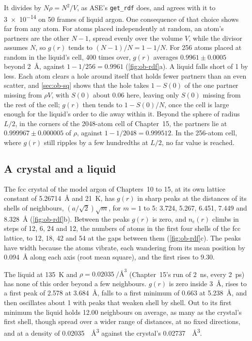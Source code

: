 \noindent It divides by $N\rho = N^2/V$, as ASE's \texttt{get\_rdf}
does\cite{Larsen2017}, and agrees with it to \num{3e-14} on 50 frames of
liquid argon. One consequence of that choice shows far from any atom.
For atoms placed independently at random, an atom's partners are the
other $N - 1$, spread evenly over the volume $V$, while the divisor
assumes $N$, so $g(r)$ tends to $(N - 1)/N = 1 - 1/N$. For 256 atoms
placed at random in the liquid's cell, 400 times over, $g(r)$ averages
$0.9961 \pm 0.0005$ beyond \SI{2}{\angstrom}, against $1 - 1/256 = 0.9961$
(\cref{fig:ob-rdf}a). A liquid falls short of 1 by less. Each atom clears
a hole around itself that holds fewer partners than an even scatter, and
\cref{sec:ob-sq} shows that the hole takes $1 - S(0)$ of the one partner
missing from $\rho V$, with $S(0)$ about 0.06 here, leaving only $S(0)$
missing from the rest of the cell; $g(r)$ then tends to $1 - S(0)/N$, once
the cell is large enough for the liquid's order to die away within it.
Beyond the sphere of radius $L/2$, in the corners of the 2048-atom cell
of Chapter~15, the partners lie at $0.999967 \pm 0.000005$ of $\rho$,
against $1 - 1/2048 = 0.999512$. In the 256-atom cell, where $g(r)$ still
ripples by a few hundredths at $L/2$, no far value is reached.

\subsection*{A crystal and a liquid}

The fcc crystal of the model argon of Chapters~10 to 15, at its own
lattice constant of \SI{5.26714}{\angstrom} and \SI{21}{\kelvin}, has
$g(r)$ in sharp peaks at the distances of its shells of neighbours,
$(a/\sqrt2)\sqrt m$, for $m = 1$ to 5: \num{3.724}, \num{5.267},
\num{6.451}, \num{7.449} and \SI{8.328}{\angstrom}
(\cref{fig:ob-rdf}b). Between the peaks $g(r)$ is zero, and $n_{\mathrm c}(r)$
climbs in steps of 12, 6, 24 and 12, the numbers of atoms in the first
four shells of the fcc lattice, to 12, 18, 42 and 54 at the gaps between
them (\cref{fig:ob-rdf}c). The peaks have width because the atoms vibrate,
each wandering from its mean position by \SI{0.094}{\angstrom} along each
axis (root mean square), and the first rises to 9.30.

The liquid at \SI{135}{\kelvin} and $\rho = \SI{0.02035}{\per\angstrom
\cubed}$ (Chapter~15's run of \SI{2}{\nano\second}, every
\SI{2}{\pico\second}) has none of this order beyond a few neighbours.
$g(r)$ is zero inside \SI{3}{\angstrom}, rises to a first peak of 2.578 at
\SI{3.684}{\angstrom}, falls to a first minimum of 0.663 at
\SI{5.238}{\angstrom}, and then oscillates about 1 with peaks that weaken
shell by shell. Out to its first minimum the liquid holds 12.00
neighbours on average, as many as the crystal's first shell, though
spread over a wider range of distances, at no fixed directions, and at a
density of \SI{0.02035}{\per\angstrom\cubed} against the crystal's
\SI{0.02737}{\per\angstrom\cubed}.

